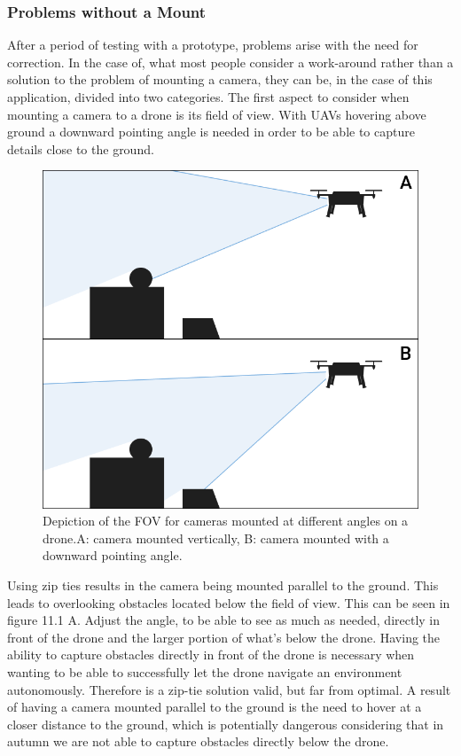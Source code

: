 \subsubsection{Problems without a Mount}

After a period of testing with a prototype, problems arise with the need for correction. In the case of, what most people consider a work-around rather than a solution to the problem of mounting a camera, they can be, in the case of this application, divided into two categories.
\newline The first aspect to consider when mounting a camera to a drone is its field of view. With UAVs hovering above ground a downward pointing angle is needed in order to be able to capture details close to the ground.  

\begin{figure}[h]
	\centering
	\includegraphics[width=0.7\linewidth]{img/FieldOfView}
	\caption{Depiction of the FOV for cameras mounted at different angles on a drone.\newline A: camera mounted vertically, B: camera mounted with a downward pointing angle.}
	\label{fig:custom_parts_FOV}
\end{figure}

Using zip ties results in the camera being mounted parallel to the ground. This leads to overlooking obstacles located below the field of view. This can be seen in figure 11.1 A. Adjust the angle, to be able to see as much as needed, directly in front of the drone and the larger portion of what's below the drone. Having the ability to capture obstacles directly in front of the drone is necessary when wanting to be able to successfully let the drone navigate an environment autonomously. Therefore is a zip-tie solution valid, but far from optimal. A result of having a camera mounted parallel to the ground is the need to hover at a closer distance to the ground, which is potentially dangerous considering that in autumn we are not able to capture obstacles directly below the drone.

